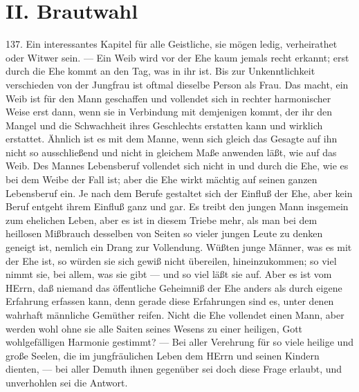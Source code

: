 \section{II. Brautwahl}

137. Ein interessantes Kapitel für alle Geistliche, sie mögen ledig, verheirathet oder Witwer sein. — Ein Weib wird vor der Ehe kaum jemals recht erkannt; erst durch die Ehe kommt an den Tag, was in ihr ist. Bis zur
Unkenntlichkeit verschieden von der Jungfrau ist oftmal dieselbe Person als Frau. Das macht, ein Weib ist für den Mann geschaffen und vollendet sich in rechter harmonischer Weise erst dann, wenn sie in Verbindung mit demjenigen kommt, der ihr den Mangel und die Schwachheit ihres Geschlechts erstatten kann und wirklich erstattet. Ähnlich ist es mit dem Manne, wenn sich gleich das Gesagte auf ihn nicht so ausschließend und nicht in gleichem Maße anwenden läßt, wie auf das Weib. Des Mannes Lebensberuf vollendet sich nicht in und durch die Ehe, wie es bei dem Weibe der Fall ist; aber die Ehe wirkt mächtig auf seinen ganzen Lebensberuf ein. Je nach dem Berufe gestaltet sich der Einfluß der Ehe, aber kein Beruf entgeht ihrem Einfluß ganz und gar. Es treibt den jungen Mann insgemein zum ehelichen Leben, aber es ist in diesem Triebe mehr, als man bei dem heillosen Mißbrauch desselben von Seiten so vieler jungen Leute zu denken geneigt ist, nemlich ein Drang zur Vollendung. Wüßten junge Männer, was es mit der Ehe ist, so würden sie sich gewiß nicht übereilen, hineinzukommen; so viel nimmt sie, bei allem, was sie gibt — und so viel läßt sie auf. Aber es ist vom HErrn, daß niemand das öffentliche Geheimniß der Ehe anders als durch eigene Erfahrung erfassen kann, denn gerade diese Erfahrungen sind es, unter denen wahrhaft männliche Gemüther reifen. Nicht die Ehe vollendet einen Mann, aber werden wohl ohne sie alle Saiten seines Wesens zu einer heiligen, Gott wohlgefälligen Harmonie gestimmt? — Bei aller Verehrung für so viele heilige und große Seelen, die im jungfräulichen Leben dem HErrn
und seinen Kindern dienten, — bei aller Demuth ihnen gegenüber sei doch diese Frage erlaubt, und unverhohlen sei die Antwort.

